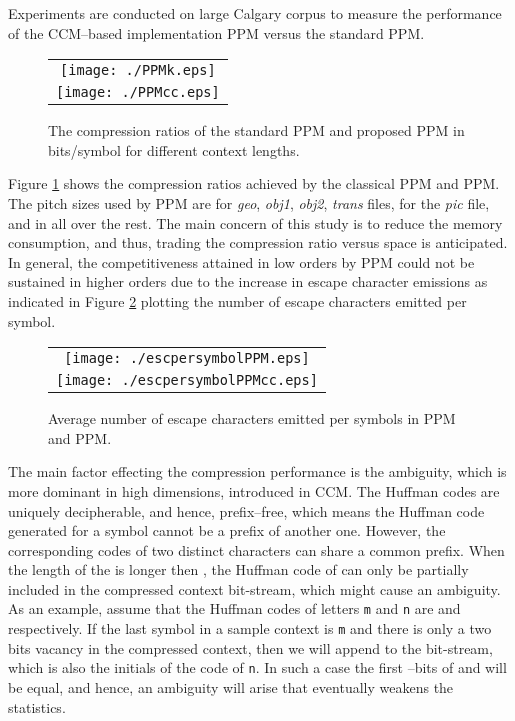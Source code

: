 \documentclass[runningheads,a4paper]{llncs}
\begin{document}
Experiments are conducted on large Calgary corpus to measure the performance of the CCM--based
implementation PPM versus the standard PPM. 

\begin{figure}
  \begin{center}
 \begin{tabular}{c}
 \texttt{[image: ./PPMk.eps]}
\\
 \texttt{[image: ./PPMcc.eps]}
\end{tabular}
\end{center}
\caption{The compression ratios of the standard PPM and proposed PPM in bits/symbol for different context
lengths.}
\label{fig:compratio}
\end{figure} 

Figure \ref{fig:compratio} shows the compression ratios achieved by the classical PPM and PPM. The pitch
sizes  used by PPM are  for  \emph{geo}, \emph{obj1}, \emph{obj2}, \emph{trans} files,  for the \emph{pic}
file, and  in all over the rest.
The main concern of this study is to reduce the memory consumption, and thus, trading the compression ratio versus space
is anticipated. 
In general, the competitiveness attained in low orders by PPM could not be sustained  in  higher orders due to
the increase in escape character emissions as indicated in Figure \ref{fig:esc} plotting the number of escape characters
emitted per symbol.

\begin{figure}
  \begin{center}
 \begin{tabular}{c}
 \texttt{[image: ./escpersymbolPPM.eps]}
\\
 \texttt{[image: ./escpersymbolPPMcc.eps]}
\end{tabular}
\end{center}
\caption{Average number of escape characters emitted per symbols in PPM and PPM.}
\label{fig:esc}
\end{figure} 

The main factor effecting the compression performance is the ambiguity, which is more dominant in high dimensions, 
introduced in CCM. The Huffman codes are uniquely decipherable, and hence, prefix--free, which means the Huffman code
generated for a symbol cannot be a prefix of another one. 
However, the corresponding codes of two distinct characters can share a common prefix. 
When the length of the  is longer then , the Huffman code of
 can only be partially included in the compressed context bit-stream, which might cause an ambiguity. 
As an example, assume that the Huffman codes of letters \texttt{m} and \texttt{n} are  and 
respectively. 
If the last symbol  in a sample context is \texttt{m} and there is only a two bits vacancy in the compressed
context, then we will append  to the bit-stream, which is also the initials of the code of \texttt{n}. 
In such a case the first --bits of  and  will be equal, and hence, an ambiguity will arise that eventually weakens the statistics.
\end{document}
